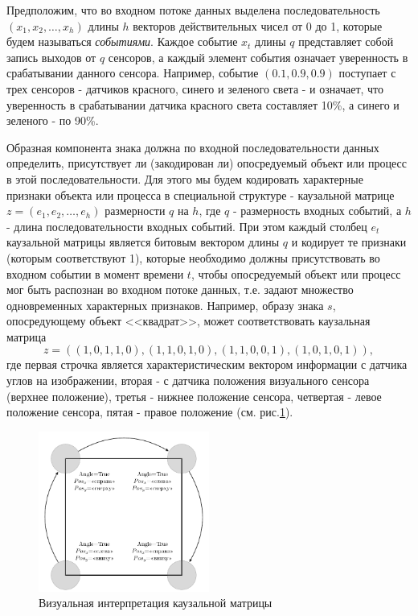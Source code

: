 \documentclass[12pt]{scrartcl}
\begin{document}
	Предположим, что во входном потоке данных выделена последовательность $(x_1,x_2,\dots,x_h)$ длины $h$ векторов действительных чисел от 0 до 1, которые будем называться \textit{событиями}. Каждое событие $x_t$ длины $q$ представляет собой запись выходов от $q$ сенсоров, а каждый элемент события означает уверенность в срабатывании данного сенсора. Например, событие $(0.1, 0.9, 0.9)$ поступает с трех сенсоров - датчиков красного, синего и зеленого света - и означает, что уверенность в срабатывании датчика красного света составляет 10\%, а синего и зеленого - по 90\%.
	
	Образная компонента знака должна по входной последовательности данных определить, присутствует ли (закодирован ли) опосредуемый объект или процесс в этой последовательности. Для этого мы будем кодировать характерные признаки объекта или процесса в специальной структуре - каузальной матрице $z=(e_1,e_2,\dots,e_h)$ размерности $q$ на $h$, где $q$ - размерность входных событий, а $h$ - длина последовательности входных событий. При этом каждый столбец $e_t$ каузальной матрицы является битовым вектором длины $q$ и кодирует те признаки (которым соответствуют 1), которые необходимо должны присутствовать во входном событии в момент времени $t$, чтобы опосредуемый объект или процесс мог быть распознан во входном потоке данных, т.е. задают множество одновременных характерных признаков. Например, образу знака $s$, опосредующему объект <<квадрат>>, может соответствовать каузальная матрица 	\[z=((1,0,1,1,0),(1,1,0,1,0),(1,1,0,0,1),(1,0,1,0,1)),\]
	где первая строчка является характеристическим вектором информации с датчика углов на изображении, вторая - с датчика положения визуального сенсора (верхнее положение), третья - нижнее положение сенсора, четвертая - левое положение сенсора, пятая - правое положение (см. рис.\ref{fig:square}).

	\begin{figure}
		\label{fig:square}
		\centering
		\includegraphics[width=0.5\textwidth]{examples/square}
		\caption{Визуальная интерпретация каузальной матрицы}		
	\end{figure}
\end{document}
